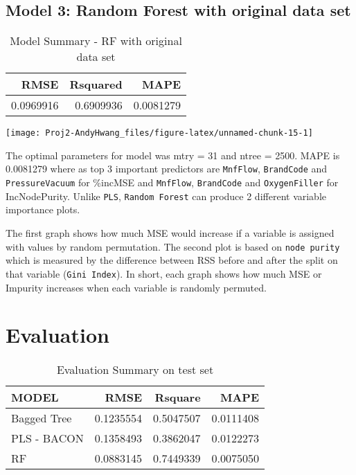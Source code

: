 \documentclass[]{report}
\begin{document}
\section{Model 3: Random Forest with original data
set}\label{model-3-random-forest-with-original-data-set}

\begin{table}[H]

\caption{\label{tab:unnamed-chunk-15}Model Summary - RF with original data set}
\centering
\fontsize{8}{10}\selectfont
\begin{tabular}[t]{rrr}
\toprule
\textbf{RMSE} & \textbf{Rsquared} & \textbf{MAPE}\\
\midrule
\rowcolor{gray!6}  0.0969916 & 0.6909936 & 0.0081279\\
\bottomrule
\end{tabular}
\end{table}

\begin{center}\texttt{[image: Proj2-AndyHwang\_files/figure-latex/unnamed-chunk-15-1]} \end{center}

The optimal parameters for model was mtry = 31 and ntree = 2500. MAPE is
0.0081279 where as top 3 important predictors are \texttt{MnfFlow},
\texttt{BrandCode} and \texttt{PressureVacuum} for \%incMSE and
\texttt{MnfFlow}, \texttt{BrandCode} and \texttt{OxygenFiller} for
IncNodePurity. Unlike \texttt{PLS}, \texttt{Random\ Forest} can produce
2 different variable importance plots.

The first graph shows how much MSE would increase if a variable is
assigned with values by random permutation. The second plot is based on
\texttt{node\ purity} which is measured by the difference between RSS
before and after the split on that variable (\texttt{Gini\ Index}). In
short, each graph shows how much MSE or Impurity increases when each
variable is randomly permuted.

\chapter{Evaluation}\label{evaluation}

\begin{table}[H]

\caption{\label{tab:unnamed-chunk-16}Evaluation Summary on test set}
\centering
\fontsize{8}{10}\selectfont
\begin{tabular}[t]{lrrr}
\toprule
\textbf{MODEL} & \textbf{RMSE} & \textbf{Rsquare} & \textbf{MAPE}\\
\midrule
\rowcolor{gray!6}  Bagged Tree & 0.1235554 & 0.5047507 & 0.0111408\\
PLS - BACON & 0.1358493 & 0.3862047 & 0.0122273\\
\rowcolor{gray!6}  RF & 0.0883145 & 0.7449339 & 0.0075050\\
\bottomrule
\end{tabular}
\end{table}
\end{document}
